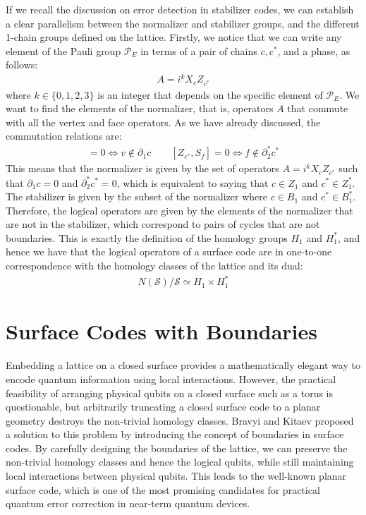\documentclass[12pt, twoside, openany]{book}
\begin{document}
If we recall the discussion on error detection in stabilizer codes, we can establish a clear parallelism between the normalizer and stabilizer groups, and the different 1-chain groups defined on the lattice. Firstly, we notice that we can write any element of the Pauli group $\mathcal{P}_E$ in terms of a pair of chains $c, c^*$, and a phase, as follows:
\begin{align}
    A = i^k X_c Z_{c^*}
\end{align}
where $k \in \{0, 1, 2, 3\}$ is an integer that depends on the specific element of $\mathcal{P}_E$. We want to find the elements of the normalizer, that is, operators $A$ that commute with all the vertex and face operators. As we have already discussed, the commutation relations are:
\begin{align}
    [X_c, S_v] = 0 \iff v \notin \partial_1 c \quad \quad [Z_{c^*}, S_f] = 0 \iff f \notin \partial_2^* c^*
\end{align}
This means that the normalizer is given by the set of operators $A = i^k X_c Z_{c^*}$ such that $\partial_1 c = 0$ and $\partial_2^* c^* = 0$, which is equivalent to saying that $c \in Z_1$ and $c^* \in Z^*_1$. The stabilizer is given by the subset of the normalizer where $c \in B_1$ and $c^* \in B^*_1$. Therefore, the logical operators are given by the elements of the normalizer that are not in the stabilizer, which correspond to pairs of cycles that are not boundaries. This is exactly the definition of the homology groups $H_1$ and $H^*_1$, and hence we have that the logical operators of a surface code are in one-to-one correspondence with the homology classes of the lattice and its dual: 
\begin{align}
    N(\mathcal{S}) / \mathcal{S} \simeq H_1 \times H^*_1
\end{align}

\section{Surface Codes with Boundaries}

Embedding a lattice on a closed surface provides a mathematically elegant way to encode quantum information using local interactions. However, the practical feasibility of arranging physical qubits on a closed surface such as a torus is questionable, but arbitrarily truncating a closed surface code to a planar geometry destroys the non-trivial homology classes. Bravyi and Kitaev \cite{bravyi1998quantumcodeslatticeboundary} proposed a solution to this problem by introducing the concept of boundaries in surface codes. By carefully designing the boundaries of the lattice, we can preserve the non-trivial homology classes and hence the logical qubits, while still maintaining local interactions between physical qubits. This leads to the well-known planar surface code, which is one of the most promising candidates for practical quantum error correction in near-term quantum devices.
\end{document}
